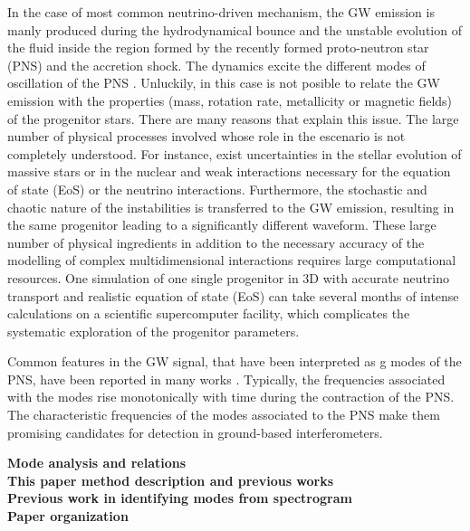 In the case of most common neutrino-driven mechanism, the GW emission is manly produced during the hydrodynamical bounce and the unstable evolution of the fluid inside the region formed by the recently formed proto-neutron star (PNS) and the accretion shock. The dynamics excite the different modes of oscillation of the PNS \cite{kokkotas, Friedman:2013}. Unluckily, in this case is not posible to relate the GW emission with the properties (mass, rotation rate, metallicity or magnetic fields) of the progenitor stars. There are many reasons that explain this issue. The large number of physical processes involved whose role in the escenario is not completely understood. For instance, exist uncertainties in the stellar evolution of massive stars or in the nuclear and weak interactions necessary for the equation of state (EoS) or the neutrino interactions. Furthermore, the stochastic and chaotic nature of the instabilities is transferred to the GW emission, resulting in the same progenitor leading to a significantly different waveform.
These large number of physical ingredients in addition to the necessary accuracy of the modelling of complex multidimensional interactions requires large computational resources. One simulation of one single progenitor in 3D with accurate neutrino transport and realistic equation of state (EoS) can take several months of intense calculations on a scientific supercomputer facility, which complicates the systematic exploration of the progenitor parameters.

Common features in the GW signal, that have been interpreted as g modes of the PNS, have been reported in many works \cite{murphy:09, Cerda:2013, mueller:13gw, Yakunin:2015, Kuroda:2016, Andresen:2017}.  Typically, the frequencies associated with the modes rise monotonically with time during the contraction of the PNS. The characteristic frequencies of the modes associated to the PNS make them promising candidates for detection in ground-based interferometers.  


\textbf{Mode analysis and relations}\\

\textbf{This paper method description and previous works}\\
\textbf{Previous work in identifying modes from spectrogram}\\
\textbf{Paper organization}\\
